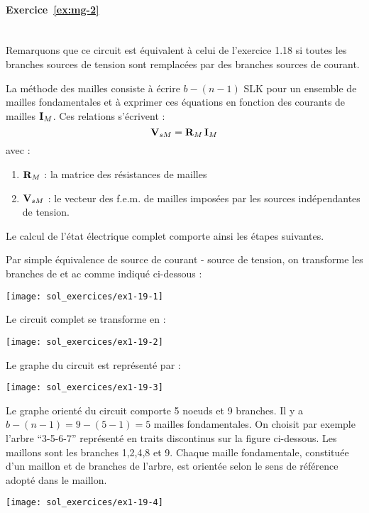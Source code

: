 \paragraph{Exercice~\ref{ex:mg-2}}~\\%
Remarquons que ce circuit est équivalent à celui de l'exercice 1.18 si
toutes les branches sources de tension sont remplacées par des
branches sources de courant. 

La méthode des mailles consiste à écrire $b-(n-1)$ SLK pour un
ensemble de mailles fondamentales et à exprimer ces équations en
fonction des courants de mailles ${\bf I}_M$. Ces relations s'écrivent
:
\[{\bf V}_{sM}={\bf R}_M \, {\bf I}_M\]
avec :
\begin{enumerate}
	\item ${\bf R}_M$ : la matrice des résistances de mailles
	\item ${\bf V}_{sM}$ : le vecteur des f.e.m. de mailles imposées par les
	sources indépendantes de tension.
\end{enumerate}

Le calcul de l'état électrique complet comporte ainsi les étapes
suivantes.


Par simple équivalence de source de courant - source de tension, on
transforme les branches de et ac comme indiqué ci-dessous :
\begin{center}
	\texttt{[image: sol\_exercices/ex1-19-1]}
\end{center}
Le circuit complet se transforme en : 
\begin{center}
	\texttt{[image: sol\_exercices/ex1-19-2]}
\end{center}


Le graphe du circuit est représenté par :
\begin{center}
	\texttt{[image: sol\_exercices/ex1-19-3]}
\end{center}
Le graphe orienté du circuit comporte 5 noeuds et 9 branches. Il y a
$b-(n-1)=9-(5-1)=5$ mailles fondamentales. On choisit par exemple
l'arbre ``3-5-6-7'' représenté en traits discontinus sur la figure ci-dessous. Les
maillons sont les branches 1,2,4,8 et 9. Chaque maille fondamentale,
constituée d'un maillon et de branches de l'arbre, est 
orientée selon le sens de référence adopté dans le maillon.
\begin{center}
	\texttt{[image: sol\_exercices/ex1-19-4]}
\end{center}


